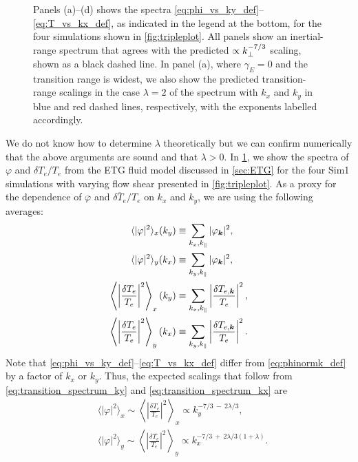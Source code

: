 \documentclass{jpp}
\newcommand{\phinorm}{\varphi}
\newcommand{\phinormk}{\overline{\phinorm}}
\newcommand{\gammaE}{\gamma_{E}}
\begin{document}
\begin{figure}
	\centering
	\caption{Panels (a)--(d) shows the spectra \cref{eq:phi_vs_ky_def}--\cref{eq:T_vs_kx_def}, as indicated in the legend at the bottom, for the four simulations shown in \cref{fig:tripleplot}. All panels show an inertial-range spectrum that agrees with the predicted \(\propto k_\perp^{-7/3}\) scaling, shown as a black dashed line. In panel (a), where \(\gammaE = 0\) and the transition range is widest, we also show the predicted transition-range scalings in the case \(\lambda = 2\) of the spectrum with \(k_x\) and \(k_y\) in blue and red dashed lines, respectively, with the exponents labelled accordingly.}
	\label{fig:flowshear_spectra}
\end{figure}


We do not know how to determine \(\lambda\) theoretically but we can confirm numerically that the above arguments are sound and that \(\lambda > 0\). In \cref{fig:flowshear_spectra}, we show the spectra of \(\phinorm\) and \(\delta T_e/T_{e}\) from the ETG fluid model discussed in \cref{sec:ETG} for the four Sim1 simulations with varying flow shear presented in \cref{fig:tripleplot}. As a proxy for the dependence of \(\phinormk\) and \(\overline{\delta T_e}/T_{e}\) on \(k_x\) and \(k_y\), we are using the following averages:
\begin{align}
	\langle|\phinorm|^2\rangle_x(k_y) &\equiv \sum_{k_x, \kpar} |\phinorm_\vk|^2, \label{eq:phi_vs_ky_def} \\
	\langle|\phinorm|^2\rangle_y(k_x) &\equiv \sum_{k_y, \kpar} |\phinorm_\vk|^2, \label{eq:phi_vs_kx_def}  \\
	\left\langle\left\vert\frac{\delta T_e}{T_{e}}\right\vert^2\right\rangle_x(k_y) &\equiv \sum_{k_x, \kpar} \left\vert\frac{\delta T_{e,\vk}}{T_{e}}\right\vert^2, \label{eq:T_vs_ky_def} \\
	\left\langle\left\vert\frac{\delta T_e}{T_{e}}\right\vert^2\right\rangle_y(k_x) &\equiv \sum_{k_y, \kpar} \left\vert\frac{\delta T_{e,\vk}}{T_{e}}\right\vert^2. \label{eq:T_vs_kx_def}
\end{align}
Note that \cref{eq:phi_vs_ky_def}--\cref{eq:T_vs_kx_def} differ from \cref{eq:phinormk_def} by a factor of \(k_x\) or \(k_y\). Thus, the expected scalings that follow from \cref{eq:transition_spectrum_ky} and \cref{eq:transition_spectrum_kx} are 
\begin{align}
	&\langle|\phinorm|^2\rangle_x \sim \left\langle\left\vert\frac{\delta T_e}{T_{e}}\right\vert^2\right\rangle_x \propto k_y^{-7/3  \ - \ 2\lambda/3}, \\
	&\langle|\phinorm|^2\rangle_y \sim \left\langle\left\vert\frac{\delta T_e}{T_{e}}\right\vert^2\right\rangle_y \propto k_x^{-7/3 \ + \ 2\lambda/3(1+\lambda)}.
\end{align}
\end{document}
